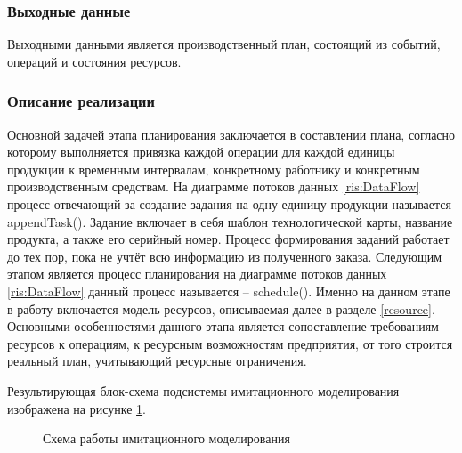 \subsubsection*{Выходные данные}
Выходными данными является производственный план, состоящий из событий, операций и состояния ресурсов.

\subsubsection*{Описание реализации}
Основной задачей этапа планирования заключается в составлении плана, согласно которому выполняется привязка каждой операции для каждой единицы продукции к временным интервалам, конкретному работнику и конкретным производственным средствам. На диаграмме потоков данных \ref{ris:DataFlow} процесс отвечающий за создание задания на одну единицу продукции называется appendTask(). Задание включает в себя шаблон технологической карты, название продукта, а также его серийный номер. Процесс формирования заданий работает до тех пор, пока не учтёт всю информацию из полученного заказа. Следующим этапом является процесс планирования на диаграмме потоков данных \ref{ris:DataFlow} данный процесс называется – schedule(). Именно на данном этапе в работу включается модель ресурсов, описываемая далее в разделе \ref{resource}. Основными особенностями данного этапа является сопоставление требованиям ресурсов к операциям, к ресурсным возможностям предприятия, от того строится реальный план, учитывающий ресурсные ограничения. 

Результирующая блок-схема подсистемы имитационного моделирования изображена на рисунке \ref{ris:IM_blockShema}.

\begin{figure}[H]
    \caption{Схема работы имитационного моделирования}
    \label{ris:IM_blockShema}
\end{figure}

